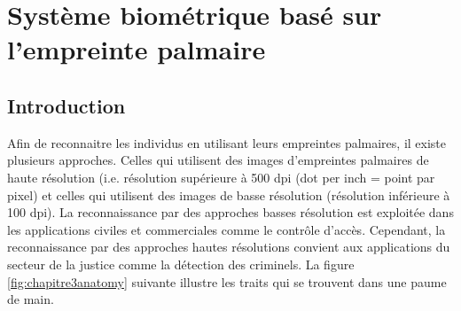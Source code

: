 \chapter{Système biométrique basé sur l’empreinte palmaire }
\label{Chapter3}
\section{Introduction}
Afin de reconnaitre les individus en utilisant leurs empreintes palmaires, il existe plusieurs approches. Celles qui utilisent des images d’empreintes palmaires de haute résolution (i.e. résolution supérieure à 500 dpi (dot per inch = point par pixel) et celles qui utilisent des images de basse résolution (résolution inférieure à 100 dpi).
La reconnaissance par des approches basses résolution est exploitée dans les applications civiles et commerciales comme le contrôle d’accès. Cependant, la reconnaissance par des approches hautes résolutions convient aux applications du secteur de la justice comme la détection des criminels.
La figure \ref{fig:chapitre3anatomy} suivante illustre les traits qui se trouvent dans une paume de main.

